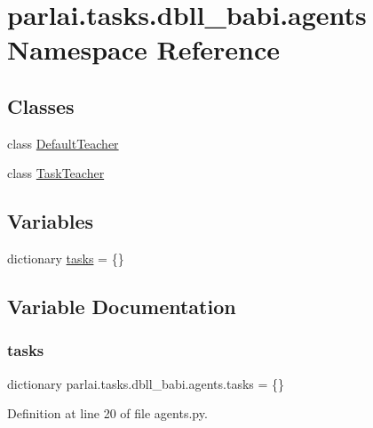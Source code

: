 \hypertarget{namespaceparlai_1_1tasks_1_1dbll__babi_1_1agents}{}\section{parlai.\+tasks.\+dbll\+\_\+babi.\+agents Namespace Reference}
\label{namespaceparlai_1_1tasks_1_1dbll__babi_1_1agents}
\subsection*{Classes}
\begin{DoxyCompactItemize}
\item 
class \hyperlink{classparlai_1_1tasks_1_1dbll__babi_1_1agents_1_1DefaultTeacher}{Default\+Teacher}
\item 
class \hyperlink{classparlai_1_1tasks_1_1dbll__babi_1_1agents_1_1TaskTeacher}{Task\+Teacher}
\end{DoxyCompactItemize}
\subsection*{Variables}
\begin{DoxyCompactItemize}
\item 
dictionary \hyperlink{namespaceparlai_1_1tasks_1_1dbll__babi_1_1agents_a1be59136324d46b6b732a570bf37d040}{tasks} = \{\}
\end{DoxyCompactItemize}


\subsection{Variable Documentation}
\mbox{\label{namespaceparlai_1_1tasks_1_1dbll__babi_1_1agents_a1be59136324d46b6b732a570bf37d040}} 
\subsubsection{\texorpdfstring{tasks}{tasks}}
{\footnotesize\ttfamily dictionary parlai.\+tasks.\+dbll\+\_\+babi.\+agents.\+tasks = \{\}}



Definition at line 20 of file agents.\+py.

